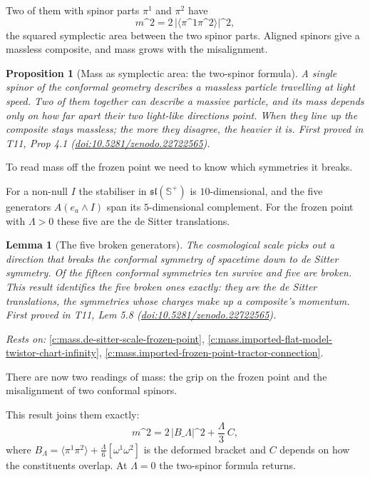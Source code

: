 \documentclass[11pt]{article}
\newtheorem{proposition}[theorem]{Proposition}
\newtheorem{lemma}[theorem]{Lemma}
\theoremstyle{definition}
\theoremstyle{plain}
\providecommand{\CS}{}\renewcommand{\CS}{{\mathbb{S}^{+}}}
\providecommand{\br}{}\renewcommand{\br}[1]{\langle #1\rangle}
\begin{document}
Two of them with spinor parts $\pi^{1}$ and $\pi^{2}$ have \[ m\^{}{2} = 2\,\bigl|\br{\pi\^{}{1}\pi\^{}{2}}\bigr|\^{}{2}, \] the squared symplectic area between the two spinor parts. Aligned spinors give a massless composite, and mass grows with the misalignment.

\begin{proposition}[Mass as symplectic area: the two-spinor formula]\label{c:mass.mass-symplectic-area-two-twistor-formula}
A single spinor of the conformal geometry describes a massless particle travelling at light speed. Two of them together can describe a massive particle, and its mass depends only on how far apart their two light-like directions point. When they line up the composite stays massless; the more they disagree, the heavier it is.
\emph{First proved in} T11, Prop 4.1 (\href{https://doi.org/10.5281/zenodo.22722565}{doi:10.5281/zenodo.22722565}).
\end{proposition}

To read mass off the frozen point we need to know which symmetries it breaks.

For a non-null $I$ the stabiliser in $\mathfrak{sl}(\CS)$ is $10$-dimensional, and the five generators $A(e_{a}\wedge I)$ span its $5$-dimensional complement. For the frozen point with $\Lambda > 0$ these five are the de Sitter translations.

\begin{lemma}[The five broken generators]\label{c:mass.five-broken-generators}
The cosmological scale picks out a direction that breaks the conformal symmetry of spacetime down to de Sitter symmetry. Of the fifteen conformal symmetries ten survive and five are broken. This result identifies the five broken ones exactly: they are the de Sitter translations, the symmetries whose charges make up a composite's momentum.
\emph{First proved in} T11, Lem 5.8 (\href{https://doi.org/10.5281/zenodo.22722565}{doi:10.5281/zenodo.22722565}).
\end{lemma}
\noindent\emph{Rests on:} \ref{c:mass.de-sitter-scale-frozen-point}, \ref{c:mass.imported-flat-model-twistor-chart-infinity}, \ref{c:mass.imported-frozen-point-tractor-connection}.

There are now two readings of mass: the grip on the frozen point and the misalignment of two conformal spinors.

This result joins them exactly: \[ m\^{}{2} = 2\,|B\_{\Lambda}|\^{}{2} + \frac{\Lambda}{3}\,C, \] where $B_{\Lambda} = \br{\pi^{1}\pi^{2}} + \tfrac{\Lambda}{6}[\omega^{1}\omega^{2}]$ is the deformed bracket and $C$ depends on how the constituents overlap. At $\Lambda = 0$ the two-spinor formula returns.
\end{document}

